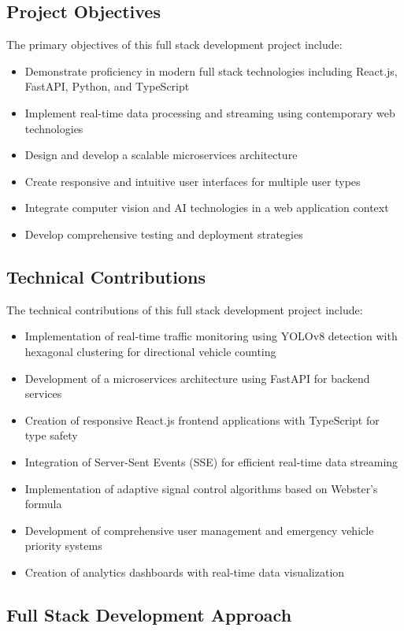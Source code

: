 \documentclass[conference]{IEEEtran}
\begin{document}
\subsection{Project Objectives}

The primary objectives of this full stack development project include:
\begin{itemize}
\item Demonstrate proficiency in modern full stack technologies including React.js, FastAPI, Python, and TypeScript
\item Implement real-time data processing and streaming using contemporary web technologies
\item Design and develop a scalable microservices architecture
\item Create responsive and intuitive user interfaces for multiple user types
\item Integrate computer vision and AI technologies in a web application context
\item Develop comprehensive testing and deployment strategies
\end{itemize}

\subsection{Technical Contributions}

The technical contributions of this full stack development project include:
\begin{itemize}
\item Implementation of real-time traffic monitoring using YOLOv8 detection with hexagonal clustering for directional vehicle counting
\item Development of a microservices architecture using FastAPI for backend services
\item Creation of responsive React.js frontend applications with TypeScript for type safety
\item Integration of Server-Sent Events (SSE) for efficient real-time data streaming
\item Implementation of adaptive signal control algorithms based on Webster's formula
\item Development of comprehensive user management and emergency vehicle priority systems
\item Creation of analytics dashboards with real-time data visualization
\end{itemize}

\subsection{Full Stack Development Approach}
\end{document}
